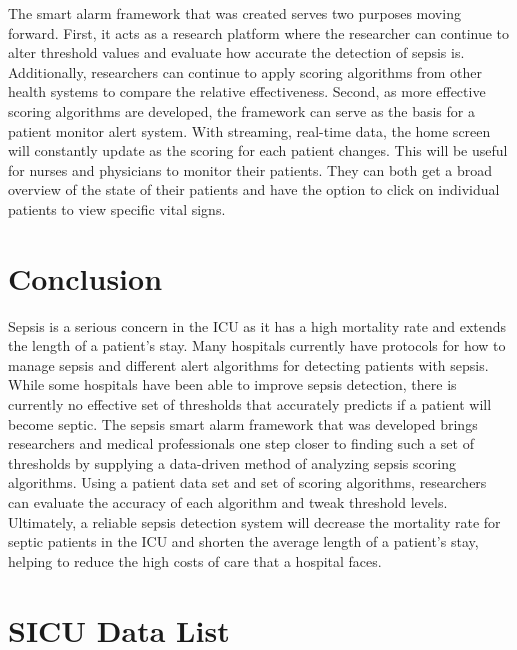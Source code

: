 \documentclass{sig-alternate}
\begin{document}
The smart alarm framework that was created serves two purposes moving forward.  First, it acts as a research platform where the researcher can continue to alter threshold values and evaluate how accurate the detection of sepsis is.  Additionally, researchers can continue to apply scoring algorithms from other health systems to compare the relative effectiveness.  Second, as more effective scoring algorithms are developed, the framework can serve as the basis for a patient monitor alert system.  With streaming, real-time data, the home screen will constantly update as the scoring for each patient changes.  This will be useful for nurses and physicians to monitor their patients.  They can both get a broad overview of the state of their patients and have the option to click on individual patients to view specific vital signs.

\vspace{10pt}
\section{Conclusion}
\vspace{10pt}
\label{sec:conclusion}

Sepsis is a serious concern in the ICU as it has a high mortality rate and extends the length of a patient's stay.  Many hospitals currently have protocols for how to manage sepsis and different alert algorithms for detecting patients with sepsis.  While some hospitals have been able to improve sepsis detection, there is currently no effective set of thresholds that accurately predicts if a patient will become septic.  The sepsis smart alarm framework that was developed brings researchers and medical professionals one step closer to finding such a set of thresholds by supplying a data-driven method of analyzing sepsis scoring algorithms.  Using a patient data set and set of scoring algorithms, researchers can evaluate the accuracy of each algorithm and tweak threshold levels.  Ultimately, a reliable sepsis detection system will decrease the mortality rate for septic patients in the ICU and shorten the average length of a patient's stay, helping to reduce the high costs of care that a hospital faces.


\vspace{10pt}

\vspace{10pt}
\appendix
\section{SICU Data List}
\label{app:sicu_data}
\end{document}
